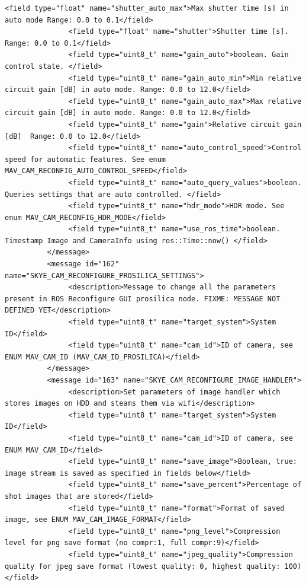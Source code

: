 \begin{lstlisting}[captionpos=b, caption="Definition of \textsc{Skye} specific Mavlink messages", label=app_xml]
               <field type="float" name="shutter_auto_max">Max shutter time [s] in auto mode Range: 0.0 to 0.1</field>
               <field type="float" name="shutter">Shutter time [s]. Range: 0.0 to 0.1</field>
               <field type="uint8_t" name="gain_auto">boolean. Gain control state. </field>
               <field type="uint8_t" name="gain_auto_min">Min relative circuit gain [dB] in auto mode. Range: 0.0 to 12.0</field>
               <field type="uint8_t" name="gain_auto_max">Max relative circuit gain [dB] in auto mode. Range: 0.0 to 12.0</field>
               <field type="uint8_t" name="gain">Relative circuit gain [dB]  Range: 0.0 to 12.0</field>
               <field type="uint8_t" name="auto_control_speed">Control speed for automatic features. See enum MAV_CAM_RECONFIG_AUTO_CONTROL_SPEED</field>
               <field type="uint8_t" name="auto_query_values">boolean. Queries settings that are auto controlled. </field>
               <field type="uint8_t" name="hdr_mode">HDR mode. See enum MAV_CAM_RECONFIG_HDR_MODE</field>
               <field type="uint8_t" name="use_ros_time">boolean. Timestamp Image and CameraInfo using ros::Time::now() </field>
          </message>
          <message id="162" name="SKYE_CAM_RECONFIGURE_PROSILICA_SETTINGS">
               <description>Message to change all the parameters present in ROS Reconfigure GUI prosilica node. FIXME: MESSAGE NOT DEFINED YET</description>
               <field type="uint8_t" name="target_system">System ID</field>
               <field type="uint8_t" name="cam_id">ID of camera, see ENUM MAV_CAM_ID (MAV_CAM_ID_PROSILICA)</field>
          </message>
          <message id="163" name="SKYE_CAM_RECONFIGURE_IMAGE_HANDLER">
               <description>Set parameters of image handler which stores images on HDD and steams them via wifi</description>
               <field type="uint8_t" name="target_system">System ID</field>
               <field type="uint8_t" name="cam_id">ID of camera, see ENUM MAV_CAM_ID</field>
               <field type="uint8_t" name="save_image">Boolean, true: image stream is saved as specified in fields below</field>
               <field type="uint8_t" name="save_percent">Percentage of shot images that are stored</field>
               <field type="uint8_t" name="format">Format of saved image, see ENUM MAV_CAM_IMAGE_FORMAT</field>
               <field type="uint8_t" name="png_level">Compression level for png save format (no compr:1, full compr:9)</field>
               <field type="uint8_t" name="jpeg_quality">Compression quality for jpeg save format (lowest quality: 0, highest quality: 100)</field>

\end{lstlisting}
